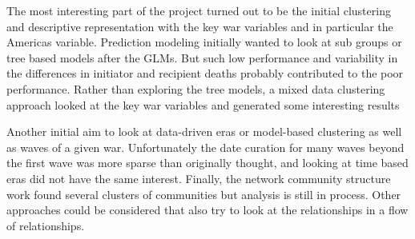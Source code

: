 \documentclass[
]{article}
\begin{document}
The most interesting part of the project turned out to be the initial
clustering and descriptive representation with the key war variables and
in particular the Americas variable. Prediction modeling initially
wanted to look at sub groups or tree based models after the GLMs. But
such low performance and variability in the differences in initiator and
recipient deaths probably contributed to the poor performance. Rather
than exploring the tree models, a mixed data clustering approach looked
at the key war variables and generated some interesting results

Another initial aim to look at data-driven eras or model-based
clustering as well as waves of a given war. Unfortunately the date
curation for many waves beyond the first wave was more sparse than
originally thought, and looking at time based eras did not have the same
interest. Finally, the network community structure work found several
clusters of communities but analysis is still in process. Other
approaches could be considered that also try to look at the
relationships in a flow of relationships.
\end{document}
